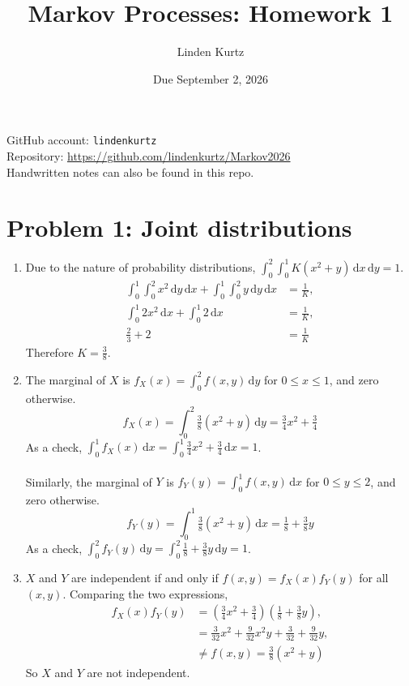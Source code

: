 \documentclass[11pt]{article}
\title{Markov Processes: Homework 1}
\author{Linden Kurtz}
\date{Due September 2, 2026}
\newcommand{\dd}{\,\mathrm{d}}
\begin{document}
\maketitle

\noindent
GitHub account: \texttt{lindenkurtz} \\
Repository: \url{https://github.com/lindenkurtz/Markov2026} \\
Handwritten notes can also be found in this repo.

\section*{Problem 1: Joint distributions}

\begin{enumerate}[label=(\alph*)]
  \item
  Due to the nature of probability distributions, $\int_0^2\!\!\int_0^1 K(x^2+y)\dd x \dd y = 1$.
  \begin{align}
    \int_0^1\!\!\int_0^2 x^2\dd y \dd x + \int_0^1\!\!\int_0^2 y\dd y \dd x &= \tfrac{1}{K}, \\
    \int_0^1 2x^2 \dd x + \int_0^1 2 \dd x &= \tfrac{1}{K}, \\
    \tfrac{2}{3} + 2 &= \tfrac{1}{K}
  \end{align}
  Therefore $K = \tfrac{3}{8}$.

  \item
  The marginal of $X$ is $f_X(x) = \int_0^2 f(x,y)\dd y$ for $0 \le x \le 1$, and zero otherwise.
  \[
    f_X(x) = \int_0^2 \tfrac{3}{8} (x^2 + y)\dd y = \tfrac{3}{4}x^2+\tfrac{3}{4}
  \]
  As a check, $\int_0^1 f_X(x)\dd x = \int_0^1 \tfrac{3}{4}x^2+\tfrac{3}{4}\dd x = 1$. \\ \\
  Similarly, the marginal of $Y$ is $f_Y(y) = \int_0^1 f(x,y)\dd x$ for $0 \le y \le 2$, and zero otherwise.
  \[
    f_Y(y) = \int_0^1 \tfrac{3}{8} (x^2 + y)\dd x = \tfrac{1}{8}+\tfrac{3}{8}y
  \]
  As a check, $\int_0^2 f_Y(y)\dd y = \int_0^2 \tfrac{1}{8}+\tfrac{3}{8}y\dd y = 1$.

  \item
  $X$ and $Y$ are independent if and only if $f(x,y) = f_X(x)f_Y(y)$ for all $(x,y)$.
  Comparing the two expressions,
  \begin{align}
    f_X(x)f_Y(y) &= (\tfrac{3}{4}x^2 + \tfrac{3}{4})(\tfrac{1}{8}+\tfrac{3}{8}y), \\
    &= \tfrac{3}{32}x^2 + \tfrac{9}{32}x^2 y + \tfrac{3}{32} + \tfrac{9}{32}y, \\
    &\not= f(x,y) = \tfrac{3}{8}(x^2 + y)
  \end{align}
  So $X$ and $Y$ are not independent.
\end{enumerate}
\end{document}
